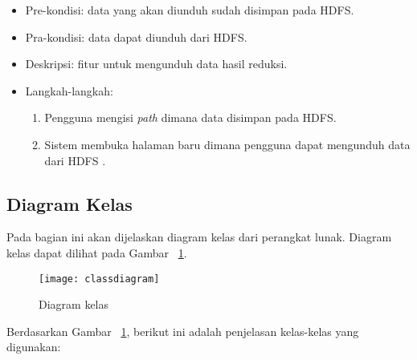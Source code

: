 \begin{enumerate}
\begin{itemize}
\item Pre-kondisi: data yang akan diunduh sudah disimpan pada HDFS.

\item Pra-kondisi: data dapat diunduh dari HDFS.

\item Deskripsi: fitur untuk mengunduh data hasil reduksi.

\item Langkah-langkah:

\begin{enumerate}

\item Pengguna mengisi \textit{path} dimana data disimpan pada HDFS.

\item Sistem membuka halaman baru dimana pengguna dapat mengunduh data dari HDFS .

\end{enumerate}

\end{itemize}

\end{enumerate}


\subsection{Diagram Kelas}

Pada bagian ini akan dijelaskan diagram kelas dari perangkat lunak. Diagram kelas dapat dilihat pada Gambar ~\ref{fig:classdiagram}.

\begin{figure}[H]
    \centering  
    \texttt{[image: classdiagram]}  
    \caption[Diagram kelas]{Diagram kelas} 
    \label{fig:classdiagram} 
\end{figure}

Berdasarkan Gambar ~\ref{fig:classdiagram}, berikut ini adalah penjelasan kelas-kelas yang digunakan:

